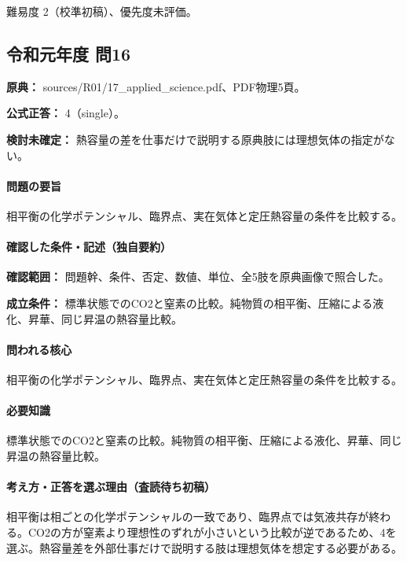 \par 難易度 2（校準初稿）、優先度未評価。

\subsection{令和元年度 問16}
\label{q:r01-reg-applied-16}

\noindent\textbf{原典：} sources/R01/17\_applied\_science.pdf、PDF物理5頁。

\textbf{公式正答：} 4（single）。

\par\textbf{検討未確定：} 熱容量の差を仕事だけで説明する原典肢には理想気体の指定がない。

\paragraph{問題の要旨} 相平衡の化学ポテンシャル、臨界点、実在気体と定圧熱容量の条件を比較する。

\paragraph{確認した条件・記述（独自要約）}\mbox{}\par

\noindent\textbf{確認範囲：} 問題幹、条件、否定、数値、単位、全5肢を原典画像で照合した。\par

\noindent\textbf{成立条件：} 標準状態でのCO2と窒素の比較。純物質の相平衡、圧縮による液化、昇華、同じ昇温の熱容量比較。\par

\paragraph{問われる核心} 相平衡の化学ポテンシャル、臨界点、実在気体と定圧熱容量の条件を比較する。

\paragraph{必要知識} 標準状態でのCO2と窒素の比較。純物質の相平衡、圧縮による液化、昇華、同じ昇温の熱容量比較。

\paragraph{考え方・正答を選ぶ理由（査読待ち初稿）} 相平衡は相ごとの化学ポテンシャルの一致であり、臨界点では気液共存が終わる。CO2の方が窒素より理想性のずれが小さいという比較が逆であるため、4を選ぶ。熱容量差を外部仕事だけで説明する肢は理想気体を想定する必要がある。


